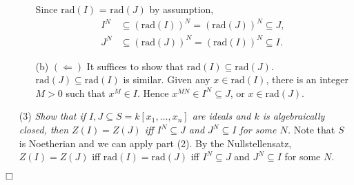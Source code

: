 \documentclass{article}
\begin{document}
\begin{enumerate}
\begin{enumerate}
    Since $\mathrm{rad}(I)$ = $\mathrm{rad}(J)$ by assumption,
    \begin{align*}
      I^N &\subseteq (\mathrm{rad}(I))^N = (\mathrm{rad}(J))^N \subseteq J, \\
      J^N &\subseteq (\mathrm{rad}(J))^N = (\mathrm{rad}(I))^N \subseteq I.
    \end{align*}
    \item[(b)]
    $(\Longleftarrow)$
    It suffices to show that $\mathrm{rad}(I) \subseteq \mathrm{rad}(J)$.
    $\mathrm{rad}(J) \subseteq \mathrm{rad}(I)$ is similar.
    Given any $x \in \mathrm{rad}(I)$, there is an integer $M > 0$ such that
    $x^M \in I$.
    Hence $x^{MN} \in I^N \subseteq J$, or $x \in \mathrm{rad}(J)$.
  \end{enumerate}
  \item[(3)]
  \emph{Show that if $I, J \subseteq S = k[x_1,\ldots,x_n]$
  are ideals and $k$ is algebraically closed,
  then $Z(I) = Z(J)$ iff $I^N \subseteq J$ and $J^N \subseteq I$ for some $N$.}
  Note that $S$ is Noetherian and we can apply part (2).
  By the Nullstellensatz, $Z(I) = Z(J)$ iff $\mathrm{rad}(I) = \mathrm{rad}(J)$
  iff $I^N \subseteq J$ and $J^N \subseteq I$ for some $N$.
\end{enumerate}
$\Box$ \\\\



\end{document}
